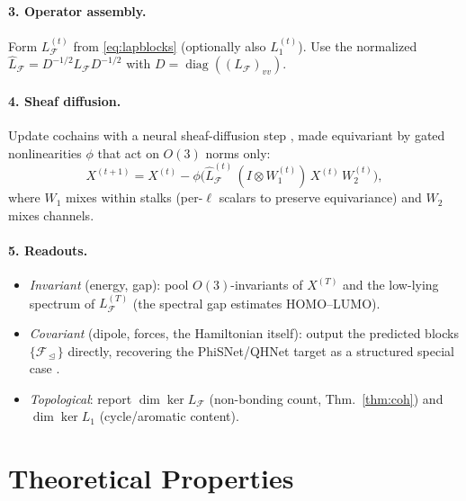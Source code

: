 \documentclass[pdflatex,sn-mathphys-num]{sn-jnl}%
\DeclareMathOperator{\diag}{diag}
\newcommand{\F}{\mathcal{F}}
\newcommand{\incid}{\trianglelefteq}
\newcommand{\restr}[2]{\F_{#1\,\incid\,#2}}
\theoremstyle{thmstyleone}
\theoremstyle{thmstyletwo}
\theoremstyle{thmstylethree}
\begin{document}
\paragraph{3. Operator assembly.} Form $L_\F^{(t)}$ from \eqref{eq:lapblocks}
(optionally also $L_1^{(t)}$). Use the normalized
$\hat L_\F=D^{-1/2}L_\F D^{-1/2}$ with $D=\diag((L_\F)_{vv})$.

\paragraph{4. Sheaf diffusion.} Update cochains with a neural sheaf-diffusion
step \cite{bodnar2022}, made equivariant by gated nonlinearities $\phi$ that act
on $O(3)$ norms only:
\begin{equation}
X^{(t+1)}=X^{(t)}-\phi\!\Big(\hat L_\F^{(t)}\,(I\otimes W_1^{(t)})\,X^{(t)}\,W_2^{(t)}\Big),
\end{equation}
where $W_1$ mixes within stalks (per-$\ell$ scalars to preserve equivariance) and
$W_2$ mixes channels.

\paragraph{5. Readouts.}
\begin{itemize}[leftmargin=1.4em,itemsep=1pt]
\item \emph{Invariant} (energy, gap): pool $O(3)$-invariants of $X^{(T)}$ and the
low-lying spectrum of $L_\F^{(T)}$ (the spectral gap estimates HOMO--LUMO).
\item \emph{Covariant} (dipole, forces, the Hamiltonian itself): output the
predicted blocks $\{\restr{}{}\}$ directly, recovering the PhiSNet/QHNet target as
a structured special case \cite{phisnet,qhnet}.
\item \emph{Topological}: report $\dim\ker L_\F$ (non-bonding count,
Thm.~\ref{thm:coh}) and $\dim\ker L_1$ (cycle/aromatic content).
\end{itemize}

\section{Theoretical Properties}\label{sec:theory}
\end{document}
